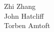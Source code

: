\documentclass[10pt]{article}
\begin{document}
\begin{center}
  {\LARGE Zhi Zhang \\}
  {\LARGE John Hatcliff \\}
  {\LARGE Torben Amtoft  \\}
\end{center}

\pagebreak


\setcounter{page}{1}

%

%

%
%
%
%


%
% 

% 


\newpage
\setcounter{page}{1}
\end{document}
